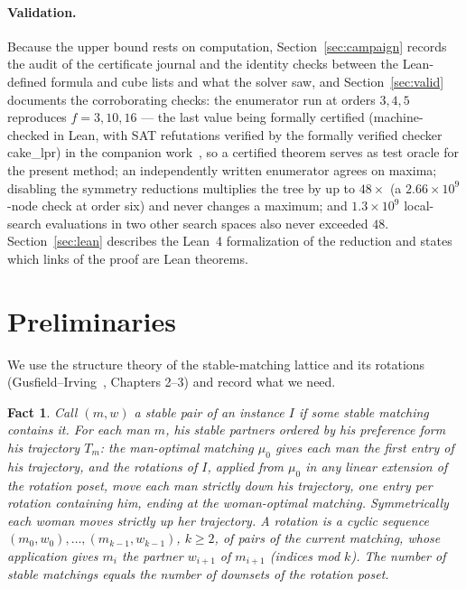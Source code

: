 \documentclass[11pt]{article}
\newtheorem{fact}{Fact}
\begin{document}
\paragraph{Validation.} Because the upper bound rests on computation, Section~\ref{sec:campaign}
records the audit of the certificate journal and the identity checks between the Lean-defined
formula and cube lists and what the solver saw, and Section~\ref{sec:valid} documents the
corroborating checks: the enumerator run at orders $3,4,5$ reproduces $f=3,10,16$ ---
the last value being formally certified (machine-checked in Lean, with SAT refutations verified by
the formally verified checker cake\_lpr) in the companion work~\cite{f5paper}, so a certified
theorem serves as test oracle for the present method; an independently written enumerator agrees
on maxima; disabling the symmetry reductions multiplies the tree by up to $48\times$ (a
$2.66\times10^9$-node check at order six) and never changes a maximum; and $1.3\times10^9$
local-search evaluations in two other search spaces also never exceeded $48$.
Section~\ref{sec:lean} describes the Lean~4 formalization of the reduction and states which links
of the proof are Lean theorems.

\section{Preliminaries}

We use the structure theory of the stable-matching lattice and its rotations
(Gusfield--Irving~\cite{gi89}, Chapters 2--3) and record what we need.

\begin{fact}\label{fact:pairs}
Call $(m,w)$ a \emph{stable pair} of an instance $I$ if some stable matching contains it. For each
man $m$, his stable partners ordered by his preference form his \emph{trajectory} $T_m$: the
man-optimal matching $\mu_0$ gives each man the first entry of his trajectory, and the rotations of
$I$, applied from $\mu_0$ in any linear extension of the rotation poset, move each man strictly
down his trajectory, one entry per rotation containing him, ending at the woman-optimal matching.
Symmetrically each woman moves strictly up her trajectory. A rotation is a cyclic sequence
$(m_0,w_0),\dots,(m_{k-1},w_{k-1})$, $k\ge 2$, of pairs of the current matching, whose application
gives $m_i$ the partner $w_{i+1}$ of $m_{i+1}$ (indices mod $k$). The number of stable matchings
equals the number of downsets of the rotation poset.
\end{fact}
\end{document}
